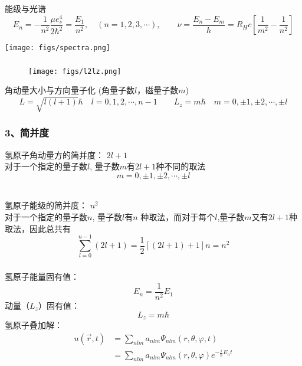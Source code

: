 \begin{frame}
  \frametitle{}
  能级与光谱
  \[ E_n = - \frac{1}{n^2} \frac{\mu e^4 _s }{2 \hbar ^2} =\frac{E_1}{n^2}, \quad (n=1,2,3,\cdots) , \qquad \nu=\frac{E_n -E_m}{h} = R_H c [\frac{1}{m^2} -\frac{1}{n^2}]
  \]
  \begin{center}
     \texttt{[image: figs/spectra.png]}
  \end{center}
\end{frame}

\begin{frame}[label=current]
  \frametitle{}
\begin{figure}[htbp]
  \centering
  \texttt{[image: figs/l2lz.png]}
\end{figure} 
角动量大小与方向量子化 (角量子数$l$，磁量子数$m$)
$$
L=\sqrt{l(l+1)}\hbar \quad l=0,1, 2, \cdots, n-1 \qquad L_z = m \hbar \quad m=0, \pm 1, \pm 2,\cdots, \pm l 
$$
\end{frame} 

\begin{frame}[label=current]
  \frametitle{3、简并度}

氢原子角动量方的简并度： $2l+1$\\
对于一个指定的量子数$l$,  量子数$m$有$2l+1$种不同的取法
 \[ m=0, \pm 1, \pm 2, \cdots ,\pm l\]

~~\\ 
氢原子能级的简并度： $n^2$\\
对于一个指定的量子数$n$, 量子数$l$有$n$ 种取法，而对于每个$l$,量子数$m$又有$2l+1$种取法，因此总共有
$$
\sum_{l=0}^{n-1}(2 l+1)=\frac{1}{2}[(2 l+1)+1] n=n^2
$$
\end{frame} 


\begin{frame}
  \frametitle{}
  \解 氢原子能量固有值：
  \[E_n = \frac{1}{n^2}E_1\]
  动量（$L_z$）固有值：
  \[L_z = m \hbar \]
  氢原子叠加解：
  \[
  \begin{aligned}
   u(\vec{r},t) &= \sum_{nlm} a_{nlm} \Psi _{nlm}(r,\theta,\varphi,t) \\
   &=  \sum_{nlm} a_{nlm} \Psi _{nlm}(r,\theta,\varphi) e^{-\frac{i}{\hbar}E_n t}
  \end{aligned} 
  \]
  \end{frame} 
  
